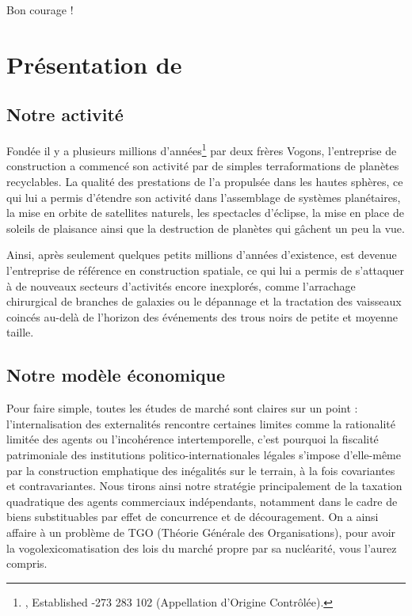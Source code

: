 Bon courage !

\newpage

\section{Présentation de \provogon{}}

\subsection{Notre activité}

Fondée il y a plusieurs millions d'années\footnote{\provogon{}, Established
-273 283 102 (Appellation d'Origine Contrôlée).} par deux frères Vogons,
l'entreprise de construction \provogon{} a commencé son activité par de simples
terraformations de planètes recyclables.  La qualité des prestations de
\provogon{} l'a propulsée dans les hautes sphères, ce qui lui a permis
d'étendre son activité dans l'assemblage de systèmes planétaires, la mise en
orbite de satellites naturels, les spectacles d'éclipse, la mise en place de
soleils de plaisance ainsi que la destruction de planètes qui gâchent un peu la
vue.

Ainsi, après seulement quelques petits millions d'années d'existence, \provogon{}
est devenue l'entreprise de référence en construction spatiale, ce qui lui a
permis de s'attaquer à de nouveaux secteurs d'activités encore inexplorés,
comme l'arrachage chirurgical de branches de galaxies ou le dépannage et la
tractation des vaisseaux coincés au-delà de l'horizon des événements des trous
noirs de petite et moyenne taille.

\subsection{Notre modèle économique}

Pour faire simple, toutes les études de marché sont claires sur un point :
l'internalisation des externalités rencontre certaines limites comme la
rationalité limitée des agents ou l'incohérence intertemporelle, c'est pourquoi
la fiscalité patrimoniale des institutions politico-internationales légales
s'impose d'elle-même par la construction emphatique des inégalités sur le
terrain, à la fois covariantes et contravariantes. Nous tirons ainsi notre
stratégie principalement de la taxation quadratique des agents commerciaux
indépendants, notamment dans le cadre de biens substituables par effet de
concurrence et de découragement. On a ainsi affaire à un problème de TGO
(Théorie Générale des Organisations), pour avoir la vogolexicomatisation des
lois du marché propre par sa nucléarité, vous l'aurez compris.

